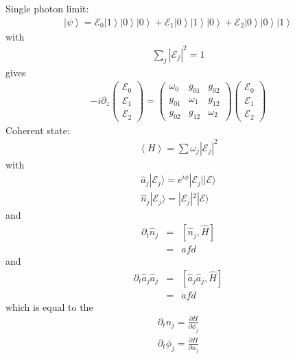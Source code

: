 \documentclass[9pt,twocolumn,twoside]{osajnl}
\begin{document}
Single photon limit:
\begin{eqnarray}
	\left|\psi\right\rangle = \mathcal{E}_0 \left|1\right\rangle
	\left|0\right\rangle
	\left|0\right\rangle +
	\mathcal{E}_1 
	\left|0\right\rangle
	\left|1\right\rangle
	\left|0\right\rangle +
	\mathcal{E}_2 
	\left|0\right\rangle
	\left|0\right\rangle
	\left|1\right\rangle
\end{eqnarray}
with
\begin{eqnarray}
	\sum_j{|\mathcal{E}_j|^2 = 1}
\end{eqnarray}
gives
\begin{eqnarray}
	-i \partial_z	
	\left( \begin{array}{c} 
		\mathcal{E}_0 \\
		\mathcal{E}_1 \\
		\mathcal{E}_2
	\end{array} \right) =
	\left( \begin{array}{ccc} 
		\omega_0  & g_{01} & g_{02} \\
		g_{01} & \omega_1 & g_{12} \\
		g_{02} & g_{12} & \omega_2
	\end{array} \right)
	\left( \begin{array}{c} 
		\mathcal{E}_0 \\
		\mathcal{E}_1 \\
		\mathcal{E}_2
	\end{array} \right)
\end{eqnarray}
Coherent state:
\begin{eqnarray}
	\left\langle H \right\rangle = \sum \omega_j |\mathcal{E}_j|^2 
\end{eqnarray}
with
\begin{eqnarray}
	\hat{a}_j | \mathcal{E}_j \rangle= e^{i \phi}|\mathcal{E}_j|| \mathcal{E}\rangle \\
	\hat{n}_j | \mathcal{E}_j \rangle= |\mathcal{E}_j|^2| \mathcal{E}\rangle
\end{eqnarray}
and 
\begin{eqnarray}
 \partial_t \hat{n}_j &=& [\hat{n}_j,\hat{H}]\\
 &=& afd
\end{eqnarray}
and
\begin{eqnarray}
\partial_t \hat{a}_j \hat{a}_j &=& [\hat{a}_j \hat{a}_j,\hat{H}]\\
&=& afd
\end{eqnarray}
which is equal to the 
\begin{eqnarray}
\partial_t n_j = \frac{\partial H}{\partial \phi_j}\\
\partial_t \phi_j = \frac{\partial H}{\partial n_j}  
\end{eqnarray}
\end{document}
